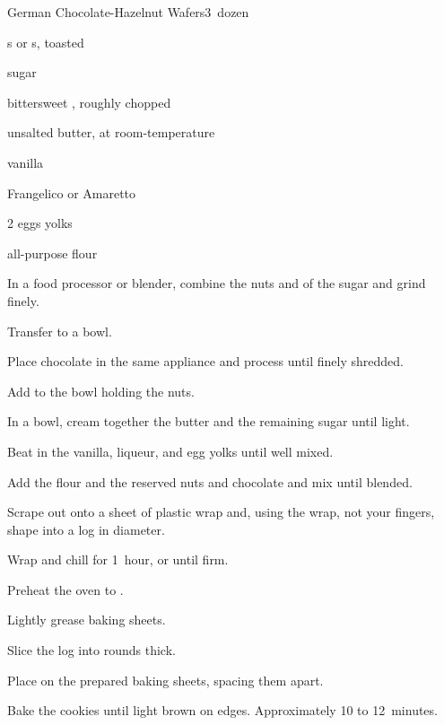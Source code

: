 \begin{recipe}{German Chocolate-Hazelnut Wafers}{}{3~dozen}

\begin{ingredients}
\item {} s or s, toasted
\item \C{\third} sugar
\item {} bittersweet , roughly chopped
\item \C{\half} unsalted butter, at room-temperature
\item {} vanilla
\item {} Frangelico or Amaretto
\item 2 eggs yolks
\item {} all-purpose flour
\end{ingredients}

\begin{directions}
\item In a food processor or blender, combine the nuts and  of the sugar and grind finely.
\item Transfer to a bowl.
\item Place chocolate in the same appliance and process until finely shredded.
\item Add to the bowl holding the nuts.
\item In a bowl, cream together the butter and the remaining sugar until light.
\item Beat in the vanilla, liqueur, and egg yolks until well mixed.
\item Add the flour and the reserved nuts and chocolate and mix until blended.
\item Scrape out onto a sheet of plastic wrap and, using the wrap, not your fingers, shape into a log \inch{2\quarter} in diameter.
\item Wrap and chill for 1~hour, or until firm.
\item Preheat the oven to .
\item Lightly grease baking sheets.
\item Slice the log into rounds \cm{\half} thick.
\item Place on the prepared baking sheets, spacing them \cm{1\half} apart.
\item Bake the cookies until light brown on edges. Approximately 10 to 12~minutes.
\end{directions}

\end{recipe}
